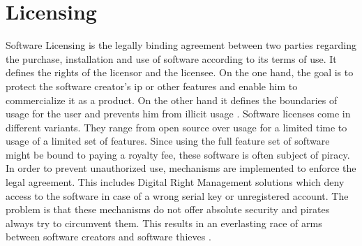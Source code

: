 \section{Licensing} \label{subsection:introduction-licensing}
Software Licensing is the legally binding agreement between two parties regarding the purchase, installation and use of software according to its terms of use.
It defines the rights of the licensor and the licensee.
On the one hand, the goal is to protect the software creator's \gls{ip} or other features and enable him to commercialize it as a product.
On the other hand it defines the boundaries of usage for the user and prevents him from illicit usage \cite{uncgLicensing}.
\newline
\newline
Software licenses come in different variants.
They range from open source over usage for a limited time to usage of a limited set of features.
Since using the full feature set of software might be bound to paying a royalty fee, these software is often subject of piracy.
In order to prevent unauthorized use, mechanisms are implemented to enforce the legal agreement.
This includes Digital Right Management solutions which deny access to the software in case of a wrong serial key or unregistered account.
\newline
\newline
The problem is that these mechanisms do not offer absolute security and pirates always try to circumvent them.
This results in an everlasting race of arms between software creators and software thieves \cite{szCopy}.
